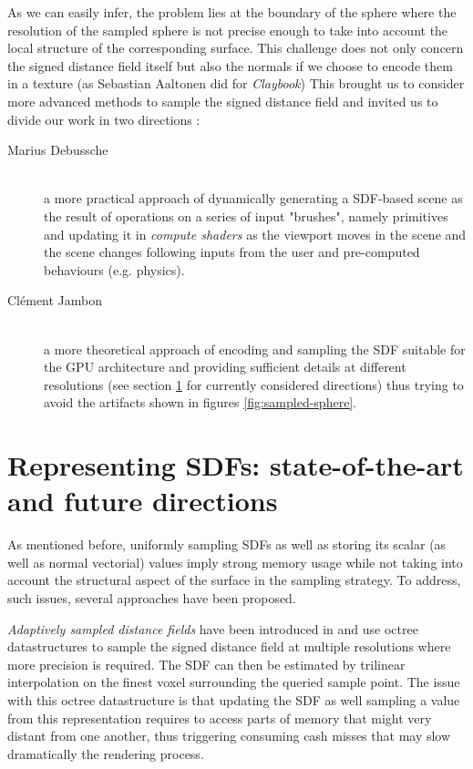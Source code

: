 \documentclass[10pt,a4paper,english, twocolumn]{article}
\begin{document}
As we can easily infer, the problem lies at the boundary of the sphere where the resolution of the sampled sphere is not precise enough to take into account the local structure of the corresponding surface. This challenge does not only concern the signed distance field itself but also the normals if we choose to encode them in a texture (as Sebastian Aaltonen did for \textit{Claybook}) This brought us to consider more advanced methods to sample the signed distance field and invited us to divide our work in two directions :
\begin{description}
    \item[Marius Debussche] $ $ \\
    a more practical approach of dynamically generating a SDF-based scene as the result of operations on a series of input "brushes", namely primitives and updating it in \textit{compute shaders} as the viewport moves in the scene and the scene changes following inputs from the user and pre-computed behaviours (e.g. physics).
    \item[Clément Jambon] $ $ \\
    a more theoretical approach of encoding and sampling the SDF suitable for the GPU architecture and providing sufficient details at different resolutions (see section \ref{sec:representing-sdf} for currently considered directions) thus trying to avoid the artifacts shown in figures \ref{fig:sampled-sphere}.
\end{description}

\section{Representing SDFs: state-of-the-art and future directions}
\label{sec:representing-sdf}

As mentioned before, uniformly sampling SDFs as well as storing its scalar (as well as normal vectorial) values imply strong memory usage while not taking into account the structural aspect of the surface in the sampling strategy. To address, such issues, several approaches have been proposed.

\textit{Adaptively sampled distance fields} have been introduced in \cite{10.1145/344779.344899} and use octree datastructures to sample the signed distance field at multiple resolutions where more precision is required. The SDF can then be estimated by trilinear interpolation on the finest voxel surrounding the queried sample point. The issue with this octree datastructure is that updating the SDF as well sampling a value from this representation requires to access parts of memory that might very distant from one another, thus triggering consuming cash misses that may slow dramatically the rendering process.
\end{document}
